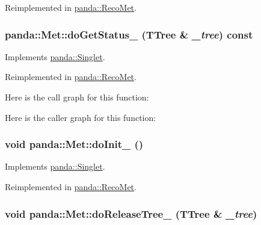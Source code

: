 Reimplemented in \hyperlink{classpanda_1_1RecoMet_aa276d8e80b96770de06ea62231930a35}{panda::RecoMet}.\hypertarget{classpanda_1_1Met_aa3b7a9f0bbbc48a0dbf21909c0c18d30}{
\subsubsection[{doGetStatus\_\-}]{ panda::Met::doGetStatus\_\- (TTree \& {\em \_\-tree}) const}}
\label{classpanda_1_1Met_aa3b7a9f0bbbc48a0dbf21909c0c18d30}


Implements \hyperlink{classpanda_1_1Singlet_ad2749c2f28a2970eda99db906a116881}{panda::Singlet}.

Reimplemented in \hyperlink{classpanda_1_1RecoMet_a17e58c29268fd0e3f84467046cf28f2b}{panda::RecoMet}.

Here is the call graph for this function:

Here is the caller graph for this function:\hypertarget{classpanda_1_1Met_a72f7fac415a4777315b1e170aa1afca4}{
\subsubsection[{doInit\_\-}]{\setlength{\rightskip}{0pt plus 5cm}void panda::Met::doInit\_\- ()}}
\label{classpanda_1_1Met_a72f7fac415a4777315b1e170aa1afca4}


Implements \hyperlink{classpanda_1_1Singlet_af5afe7bf7b223c51d1763953ac24d261}{panda::Singlet}.

Reimplemented in \hyperlink{classpanda_1_1RecoMet_aa94e2fce017ff71bd6fcfa4f02356248}{panda::RecoMet}.\hypertarget{classpanda_1_1Met_a6df0a7e59b6d57c0e2b86702383f509d}{
\subsubsection[{doReleaseTree\_\-}]{\setlength{\rightskip}{0pt plus 5cm}void panda::Met::doReleaseTree\_\- (TTree \& {\em \_\-tree})}}
\label{classpanda_1_1Met_a6df0a7e59b6d57c0e2b86702383f509d}


